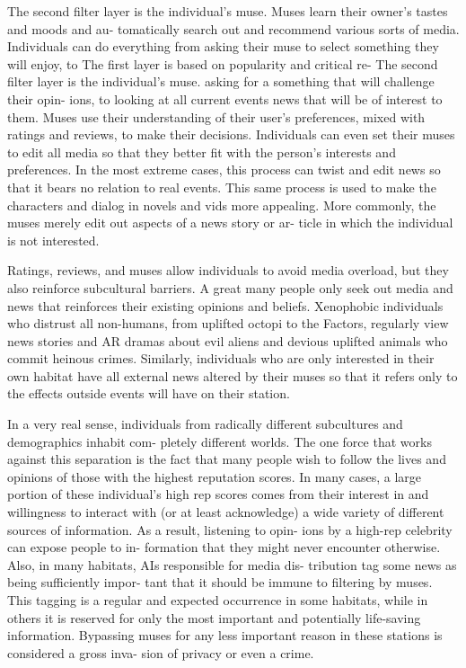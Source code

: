The second filter layer is the individual's muse. 
Muses learn their owner's tastes and moods and au-
tomatically search out and recommend various sorts 
of media. Individuals can do everything from asking 
their muse to select something they will enjoy, to 
The first layer is based on popularity and critical re-
The second filter layer is the individual's muse. 
asking for a something that will challenge their opin-
ions, to looking at all current events news that will 
be of interest to them. Muses use their understanding 
of their user's preferences, mixed with ratings and 
reviews, to make their decisions. Individuals can even 
set their muses to edit all media so that they better fit 
with the person's interests and preferences. In the most 
extreme cases, this process can twist and edit news 
so that it bears no relation to real events. This same 
process is used to make the characters and dialog in 
novels and vids more appealing. More commonly, the 
muses merely edit out aspects of a news story or ar-
ticle in which the individual is not interested.

Ratings, reviews, and muses allow individuals 
to avoid media overload, but they also reinforce 
subcultural barriers. A great many people only seek 
out media and news that reinforces their existing 
opinions and beliefs. Xenophobic individuals who 
distrust all non-humans, from uplifted octopi to the 
Factors, regularly view news stories and AR dramas 
about evil aliens and devious uplifted animals who 
commit heinous crimes. Similarly, individuals who are 
only interested in their own habitat have all external 
news altered by their muses so that it refers only to 
the effects outside events will have on their station.

In a very real sense, individuals from radically 
different subcultures and demographics inhabit com-
pletely different worlds. The one force that works 
against this separation is the fact that many people 
wish to follow the lives and opinions of those with 
the highest reputation scores. In many cases, a large 
portion of these individual's high rep scores comes 
from their interest in and willingness to interact with 
(or at least acknowledge) a wide variety of different 
sources of information. As a result, listening to opin-
ions by a high-rep celebrity can expose people to in-
formation that they might never encounter otherwise. 
Also, in many habitats, AIs responsible for media dis-
tribution tag some news as being sufficiently impor-
tant that it should be immune to filtering by muses. 
This tagging is a regular and expected occurrence 
in some habitats, while in others it is reserved for 
only the most important and potentially life-saving 
information. Bypassing muses for any less important 
reason in these stations is considered a gross inva-
sion of privacy or even a crime.

